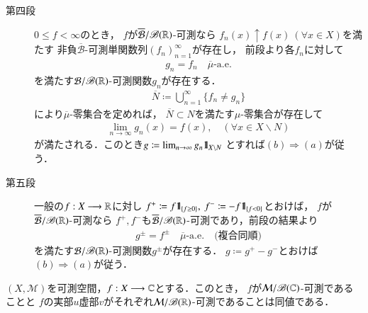 \begin{prf}
\begin{description}
				\item[第四段]
					$0 \leq f < \infty$のとき，
					$f$が$\overline{\mathcal{B}}/\mathscr{B}(\mathbb{R})$-可測なら
					$f_n(x) \uparrow f(x)\ (\forall x \in X)$を満たす
					非負$\overline{\mathcal{B}}$-可測単関数列$(f_n)_{n=1}^\infty$が存在し，
					前段より各$f_n$に対して
					\begin{align}
						g_n = f_n \quad \mbox{$\overline{\mu}$-a.e.}
					\end{align}
					を満たす$\mathcal{B}/\mathscr{B}(\mathbb{R})$-可測関数$g_n$が存在する．
					\begin{align}
						\overline{N} \coloneqq \bigcup_{n=1}^\infty\{f_n \neq g_n\}
					\end{align}
					により$\overline{\mu}$-零集合を定めれば，
					$\overline{N} \subset N$を満たす$\mu$-零集合が存在して
					\begin{align}
						\lim_{n \to \infty}g_n(x) = f(x),
						\quad (\forall x \in X \backslash N)
					\end{align}
					が満たされる．このとき$g \coloneqq \lim_{n \to \infty} g_n \mbox{1}\hspace{-0.25em}\mbox{l}_{X \backslash N}$
					とすれば$(b) \Rightarrow (a)$が従う．
					
				\item[第五段]
					一般の$f:X \longrightarrow \mathbb{R}$に対し
					$f^+ \coloneqq f \mbox{1}\hspace{-0.25em}\mbox{l}_{\{f \geq 0\}},\ f^- \coloneqq -f \mbox{1}\hspace{-0.25em}\mbox{l}_{\{f < 0\}}$とおけば，
					$f$が$\overline{\mathcal{B}}/\mathscr{B}(\mathbb{R})$-可測なら
					$f^+,f^-$も$\overline{\mathcal{B}}/\mathscr{B}(\mathbb{R})$-可測であり，前段の結果より
					\begin{align}
						g^\pm = f^\pm \quad \mbox{$\overline{\mu}$-a.e.}
						\quad \mbox{(複合同順)}
					\end{align}
					を満たす$\mathcal{B}/\mathscr{B}(\mathbb{R})$-可測関数$g^{\pm}$が存在する．
					$g \coloneqq g^+ - g^-$とおけば$(b) \Rightarrow (a)$が従う．
					\QED
			\end{description}
		\end{prf}
		
		\begin{screen}
			\begin{lem}[複素数値関数の可測性]\label{thm:measurability_of_complex_measurable_functions}
				$(X,\mathcal{M})$を可測空間，$f:X \longrightarrow \mathbb{C}$とする．このとき，
				$f$が$\mathcal{M}/\mathscr{B}(\mathbb{C})$-可測であることと
				$f$の実部$u$虚部$v$がそれぞれ$\mathcal{M}/\mathscr{B}(\mathbb{R})$-可測であることは同値である．
			\end{lem}
		\end{screen}
	
